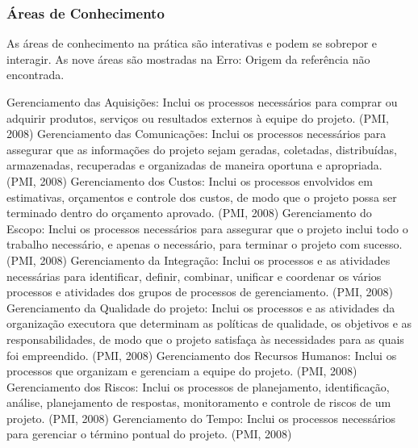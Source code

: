\subsubsection{Áreas de Conhecimento}
As áreas de conhecimento na prática são interativas e podem se sobrepor e interagir. As nove áreas são mostradas na Erro: Origem da referência não encontrada.


Gerenciamento das Aquisições: Inclui os processos necessários para comprar ou adquirir produtos, serviços ou resultados externos à equipe do projeto. (PMI, 2008)
Gerenciamento das Comunicações: Inclui os processos necessários para assegurar que as informações do projeto sejam geradas, coletadas, distribuídas, armazenadas, recuperadas e organizadas de maneira oportuna e apropriada. (PMI, 2008)
Gerenciamento dos Custos: Inclui os processos envolvidos em estimativas, orçamentos e controle dos custos, de modo que o projeto possa ser terminado dentro do orçamento aprovado. (PMI, 2008)
Gerenciamento do Escopo: Inclui os processos necessários para assegurar que o projeto inclui todo o trabalho necessário, e apenas o necessário, para terminar o projeto com sucesso. (PMI, 2008)
Gerenciamento da Integração: Inclui os processos e as atividades necessárias para identificar, definir, combinar, unificar e coordenar os vários processos e atividades dos grupos de processos de gerenciamento. (PMI, 2008)
Gerenciamento da Qualidade do projeto: Inclui os processos e as atividades da organização executora que determinam as políticas de qualidade, os objetivos e as responsabilidades, de modo que o projeto satisfaça às necessidades para as quais foi empreendido. (PMI, 2008)
Gerenciamento dos Recursos Humanos: Inclui os processos que organizam e gerenciam a equipe do projeto. (PMI, 2008)
Gerenciamento dos Riscos: Inclui os processos de planejamento, identificação, análise, planejamento de respostas, monitoramento e controle de riscos de um projeto. (PMI, 2008)
Gerenciamento do Tempo: Inclui os processos necessários para gerenciar o término pontual do projeto. (PMI, 2008)

